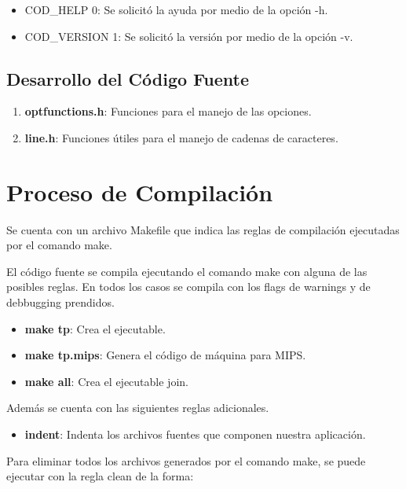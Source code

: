 \documentclass[a4paper, 10pt, twoside, notitlepage]{article}
\begin{document}
\begin{itemize}
 \item COD\_HELP 0: Se solicitó la ayuda por medio de la opción -h.
 \item COD\_VERSION 1: Se solicitó la versión por medio de la opción -v.
\end{itemize}

\newpage
\subsection{Desarrollo del Código Fuente}
\lipsum[3-3]

\begin{enumerate}
 \item \textbf{optfunctions.h}: Funciones para el manejo de las opciones.
 \item \textbf{line.h}: Funciones útiles para el manejo de cadenas de caracteres.
\end{enumerate}

\lipsum[3-3]



\section{Proceso de Compilación}

Se cuenta con un archivo Makefile que indica las reglas de compilación ejecutadas por el comando make.

El código fuente se compila ejecutando el comando make con alguna de las posibles reglas. En todos los casos se compila con los flags de warnings y de debbugging prendidos.

\begin{itemize} 
 \item[] \textbf{make tp}: Crea el ejecutable.
 \item[] \textbf{make tp.mips}: Genera el código de máquina para MIPS.
 \item[] \textbf{make all}: Crea el ejecutable join.
\end{itemize}

Además se cuenta con las siguientes reglas adicionales.

\begin{itemize}
 \item[] \textbf{indent}: Indenta los archivos fuentes que componen nuestra aplicación.
\end{itemize}

Para eliminar todos los archivos generados por el comando make, se puede ejecutar con la regla clean de la forma:
\end{document}
